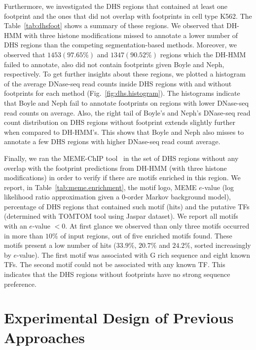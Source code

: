 \documentclass{bioinfo}
\begin{document}
{Furthermore, we investigated the DHS regions that contained at least one footprint and
the ones that did not overlap with footprints in cell type K562. The Table~\ref{tab:dhsfoot}
shows a summary of these regions. We observed that DH-HMM with three histone modifications
missed to annotate a lower number of DHS regions than the competing segmentation-based
methods. Moreover, we observed that $1453 (97.65\%)$ and $1347 (90.52\%)$ regions which
the DH-HMM failed to annotate, also did not contain footprints given Boyle and Neph,
respectively. To get further insights about these regions, we plotted a histogram of
the average DNase-seq read counts inside DHS regions with and without footprints for each
method (Fig.~\ref{fig:dhs.histogram}). The histograms indicate that Boyle and Neph fail to
annotate footprints on regions with lower DNase-seq read counts on average. Also, the right tail of
Boyle's and Neph's DNase-seq read count distribution on DHS regions without footprint extends
slightly further when compared to DH-HMM's. This shows that Boyle and Neph also misses
to annotate a few DHS regions with higher DNase-seq read count average.

Finally, we ran the MEME-ChIP tool~\citep{machanick2011} in the set of DHS
regions without any overlap with the footprint predictions from DH-HMM (with
three histone modifications) in order to verify if there are motifs enriched
in this region. We report, in Table~\ref{tab:meme.enrichment}, the motif logo,
MEME $e$-value (log likelihood ratio approximation given a $0$-order Markov background
model), percentage of DHS regions that contained such motif (hits) and the putative
TFs (determined with TOMTOM tool using Jaspar dataset). We report all motifs with an
$e$-value $< 0$. At first glance we observed than only three motifs occurred in more
than $10\%$ of input regions, out of five enriched motifs found. These motifs present
a low number of hits ($33.9\%$, $20.7\%$ and $24.2\%$, sorted increasingly by $e$-value).
The first motif was associated with G rich sequence and eight known TFs. The
second motif could not be associated with any known TF. This indicates that the
DHS regions without footprints have no strong sequence preference. 

}

\section{Experimental Design of Previous Approaches}
\label{sec:experimental.previous.approaches}
\end{document}
